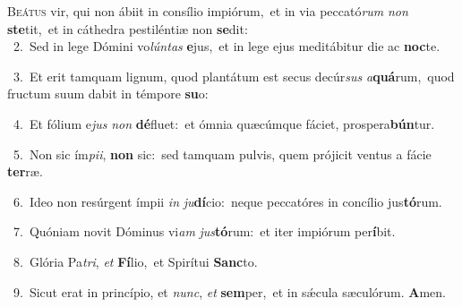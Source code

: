 \lettrine{\initial\textcolor{\initialcolor}{B}}{eátus} vir, qui non ábiit in consílio impiórum,~\dagger et in via peccató\textit{rum} \textit{non} \textbf{ste}\-tit,~\star et in cáthedra pestiléntiæ non \textbf{se}\-dit:\\
{\numbfont\textcolor{\numbcolor}{~2.}}~Sed in lege Dómini vo\-\textit{lún}\-\textit{tas} \textbf{e}\-jus,~\star et in lege ejus meditábitur die ac \textbf{noc}\-te.\par
{\numbfont\textcolor{\numbcolor}{~3.}}~Et erit tamquam lignum, quod plantátum est secus decúr\textit{sus} \textit{a}\-\textbf{quá}rum,~\star quod fructum suum dabit in témpore \textbf{su}\-o:\par
{\numbfont\textcolor{\numbcolor}{~4.}}~Et fólium e\textit{jus} \textit{non} \textbf{dé}\-fluet:~\star et ómnia quæcúmque fáciet, prospera\-\textbf{bún}\-tur.\par
{\numbfont\textcolor{\numbcolor}{~5.}}~Non sic ím\-\textit{pi}\-\textit{i}, \textbf{non} sic:~\star sed tamquam pulvis, quem prójicit ventus a fácie \textbf{ter}\-ræ.\par
{\numbfont\textcolor{\numbcolor}{~6.}}~Ideo non resúrgent ímpii \textit{in} \textit{ju}\-\textbf{dí}cio:~\star neque peccatóres in concílio jus\-\textbf{tó}\-rum.\par
{\numbfont\textcolor{\numbcolor}{~7.}}~Quóniam novit Dóminus vi\textit{am} \textit{jus}\-\textbf{tó}rum:~\star et iter impiórum per\-\textbf{í}\-bit.\par
{\numbfont\textcolor{\numbcolor}{~8.}}~Glória Pa\-\textit{tri}\-, \textit{et} \textbf{Fí}\-lio,~\star et Spirítui \textbf{Sanc}\-to.\par
{\numbfont\textcolor{\numbcolor}{~9.}}~Sicut erat in princípio, et \textit{nunc}\-, \textit{et} \textbf{sem}\-per,~\star et in sǽcula sæculórum. \textbf{A}\-men.\par
